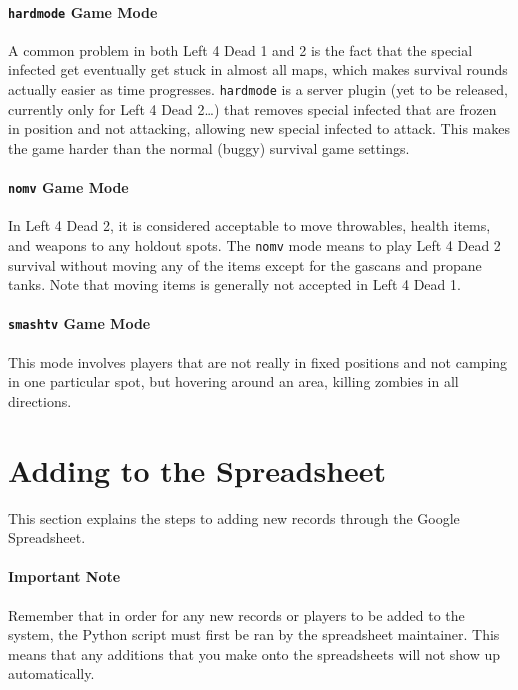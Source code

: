 \paragraph{\texttt{hardmode} Game Mode}
A common problem in both Left 4 Dead 1 and 2 is the fact that the special infected get eventually get stuck in almost all maps, which makes survival rounds actually easier as time progresses. \texttt{hardmode} is a server plugin (yet to be released, currently only for Left 4 Dead 2\ldots) that removes special infected that are frozen in position and not attacking, allowing new special infected to attack. This makes the game harder than the normal (buggy) survival game settings.

\paragraph{\texttt{nomv} Game Mode}
In Left 4 Dead 2, it is considered acceptable to move throwables, health items, and weapons to any holdout spots. The \texttt{nomv} mode means to play Left 4 Dead 2 survival without moving any of the items except for the gascans and propane tanks. Note that moving items is generally not accepted in Left 4 Dead 1.

\paragraph{\texttt{smashtv} Game Mode}
This mode involves players that are not really in fixed positions and not camping in one particular spot, but hovering around an area, killing zombies in all directions.

\section{Adding to the Spreadsheet} \label{sec:adding}
This section explains the steps to adding new records through the Google Spreadsheet.
\paragraph{Important Note}
Remember that in order for any new records or players to be added to the system, the Python script must first be ran by the spreadsheet maintainer. This means that any additions that you make onto the spreadsheets will not show up automatically.

